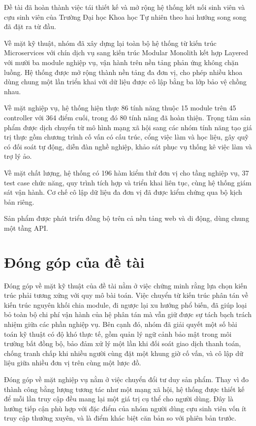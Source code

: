 \documentclass[12pt,a4paper,oneside]{report}
\begin{document}
Đề tài đã hoàn thành việc tái thiết kế và mở rộng hệ thống kết nối sinh viên và cựu sinh viên của Trường Đại học Khoa học Tự nhiên theo hai hướng song song đã đặt ra từ đầu.

Về mặt kỹ thuật, nhóm đã xây dựng lại toàn bộ hệ thống từ kiến trúc Microservices với chín dịch vụ sang kiến trúc Modular Monolith kết hợp Layered với mười ba module nghiệp vụ, vận hành trên nền tảng phản ứng không chặn luồng. Hệ thống được mở rộng thành nền tảng đa đơn vị, cho phép nhiều khoa dùng chung một lần triển khai với dữ liệu được cô lập bằng ba lớp bảo vệ chồng nhau.

Về mặt nghiệp vụ, hệ thống hiện thực 86 tính năng thuộc 15 module trên 45 controller với 364 điểm cuối, trong đó 80 tính năng đã hoàn thiện. Trọng tâm sản phẩm được dịch chuyển từ mô hình mạng xã hội sang các nhóm tính năng tạo giá trị thực gồm chương trình cố vấn có cấu trúc, cổng việc làm và học liệu, gây quỹ có đối soát tự động, diễn đàn nghề nghiệp, khảo sát phục vụ thống kê việc làm và trợ lý ảo.

Về mặt chất lượng, hệ thống có 196 hàm kiểm thử đơn vị cho tầng nghiệp vụ, 37 test case chức năng, quy trình tích hợp và triển khai liên tục, cùng hệ thống giám sát vận hành. Cơ chế cô lập dữ liệu đa đơn vị đã được kiểm chứng qua bộ kịch bản riêng.

Sản phẩm được phát triển đồng bộ trên cả nền tảng web và di động, dùng chung một tầng API.

\section{Đóng góp của đề tài}

Đóng góp về mặt kỹ thuật của đề tài nằm ở việc chứng minh rằng lựa chọn kiến trúc phải tương xứng với quy mô bài toán. Việc chuyển từ kiến trúc phân tán về kiến trúc nguyên khối chia module, đi ngược lại xu hướng phổ biến, đã giúp loại bỏ toàn bộ chi phí vận hành của hệ phân tán mà vẫn giữ được sự tách bạch trách nhiệm giữa các phần nghiệp vụ. Bên cạnh đó, nhóm đã giải quyết một số bài toán kỹ thuật có độ khó thực tế, gồm quản lý ngữ cảnh bảo mật trong môi trường bất đồng bộ, bảo đảm xử lý một lần khi đối soát giao dịch thanh toán, chống tranh chấp khi nhiều người cùng đặt một khung giờ cố vấn, và cô lập dữ liệu giữa nhiều đơn vị trên cùng một lược đồ.

Đóng góp về mặt nghiệp vụ nằm ở việc chuyển đổi tư duy sản phẩm. Thay vì đo thành công bằng lượng tương tác như một mạng xã hội, hệ thống được thiết kế để mỗi lần truy cập đều mang lại một giá trị cụ thể cho người dùng. Đây là hướng tiếp cận phù hợp với đặc điểm của nhóm người dùng cựu sinh viên vốn ít truy cập thường xuyên, và là điểm khác biệt căn bản so với phiên bản trước.
\end{document}

